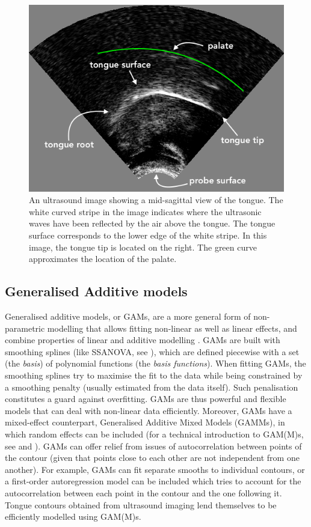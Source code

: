 \documentclass[12pt,]{article}
\begin{document}
\begin{figure}
  \centering
  \includegraphics{./img/uti.png}
  \caption{An ultrasound image showing a mid-sagittal view of the tongue. The white curved stripe in the image indicates where the ultrasonic waves have been reflected by the air above the tongue. The tongue surface corresponds to the lower edge of the white stripe. In this image, the tongue tip is located on the right. The green curve approximates the location of the palate.}
  \label{f:uti}
\end{figure}

\hypertarget{generalised-additive-models}{%
\subsection{Generalised Additive
models}\label{generalised-additive-models}}

Generalised additive models, or GAMs, are a more general form of
non-parametric modelling that allows fitting non-linear as well as
linear effects, and combine properties of linear and additive modelling
\citep{hastie1986}. GAMs are built with smoothing splines (like SSANOVA,
see \citealt{helwig2016}), which are defined piecewise with a set (the
\emph{basis}) of polynomial functions (the \emph{basis functions}). When
fitting GAMs, the smoothing splines try to maximise the fit to the data
while being constrained by a smoothing penalty (usually estimated from
the data itself). Such penalisation constitutes a guard against
overfitting. GAMs are thus powerful and flexible models that can deal
with non-linear data efficiently. Moreover, GAMs have a mixed-effect
counterpart, Generalised Additive Mixed Models (GAMMs), in which random
effects can be included (for a technical introduction to GAM(M)s, see
\citet{zuur2012} and \citet{wood2017}). GAMs can offer relief from
issues of autocorrelation between points of the contour (given that
points close to each other are not independent from one another). For
example, GAMs can fit separate smooths to individual contours, or a
first-order autoregression model can be included which tries to account
for the autocorrelation between each point in the contour and the one
following it. Tongue contours obtained from ultrasound imaging lend
themselves to be efficiently modelled using GAM(M)s.
\end{document}
